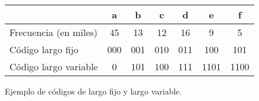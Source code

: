 \begin{figure}[b]
    	\centering
    
    \begin{tabular}{l|cccccc}
    		& a & b & c & d & e & f \\
    		\midrule
    		Frecuencia (en miles) & 45 & 13 & 12 & 16 & 9 & 5 \\
    		Código largo fijo & 000 & 001 & 010 & 011 & 100 & 101 \\
    		Código largo variable & 0 & 101 & 100 & 111 & 1101 & 1100 \\
    \end{tabular}

    \caption{Ejemplo de códigos de largo fijo y largo variable.}
    \label{fig:fixedVarLength}
\end{figure}
